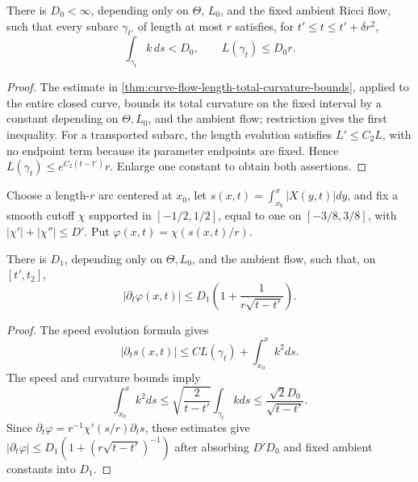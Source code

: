 \begin{theorem}
\label{lem:evolved-subarc-global-bounds}
\notready
There is $D_0<\infty$, depending only on $\Theta$, $L_0$, and the fixed
ambient Ricci flow, such that every subarc $\gamma_{t'}$ of length at most
$r$ satisfies, for $t'\le t\le t'+\delta r^2$,
\[
 \int_{\gamma_t}k\,ds<D_0,\qquad L(\gamma_t)\le D_0r.
\]
\end{theorem}
\begin{proof}
The estimate in \ref{thm:curve-flow-length-total-curvature-bounds}, applied
to the entire closed curve, bounds its total curvature on the fixed interval
by a constant depending on
$\Theta,L_0$, and the ambient flow; restriction gives the first inequality.
For a transported subarc, the length evolution satisfies
$L'\le C_2L$, with no endpoint term because its parameter endpoints are
fixed.  Hence $L(\gamma_t)\le e^{C_2(t-t')}r$.  Enlarge one constant to
obtain both assertions.
\end{proof}

Choose a length-$r$ arc centered at $x_0$, let
$s(x,t)=\int_{x_0}^x|X(y,t)|dy$, and fix a smooth cutoff $\chi$ supported in
$[-1/2,1/2]$, equal to one on $[-3/8,3/8]$, with
$|\chi'|+|\chi''|\le D'$.  Put $\varphi(x,t)=\chi(s(x,t)/r)$.

\begin{theorem}
\label{lem:localized-cutoff-time-derivative}
\notready
There is $D_1$, depending only on $\Theta,L_0$, and the ambient flow, such
that, on $[t',t_2]$,
\[
 |\partial_t\varphi(x,t)|
 \le D_1\left(1+\frac1{r\sqrt{t-t'}}\right).
\]
\end{theorem}
\begin{proof}
The speed evolution formula gives
\[
 |\partial_ts(x,t)|
 \le C L(\gamma_t)+\int_{x_0}^x k^2ds.
\]
The speed and curvature bounds imply
\[
 \int_{x_0}^xk^2ds
 \le\sqrt{\frac2{t-t'}}\int_{\gamma_t}kds
 \le\frac{\sqrt2D_0}{\sqrt{t-t'}}.
\]
Since $\partial_t\varphi=r^{-1}\chi'(s/r)\partial_ts$, these estimates give
$|\partial_t\varphi|\le D_1(1+(r\sqrt{t-t'})^{-1})$ after absorbing
$D'D_0$ and fixed ambient constants into $D_1$.
\end{proof}


